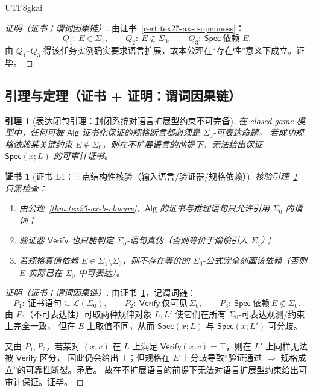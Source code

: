 \documentclass[12pt]{article}
\newtheorem{lemma}{引理}[section]
\newtheorem{Certificate}{证书}[section]
\begin{document}
\begin{CJK*}{UTF8}{gkai}
\begin{proof}[证明（证书；谓词因果链）]
由证书~\ref{cert:tex25-ax-c-openness}：
\[
  Q_1:\ E\in\Sigma_1,\qquad
  Q_2:\ E\notin\Sigma_0,\qquad
  Q_3:\ \mathsf{Spec}\ \text{依赖 }E.
\]
由 $Q_1$--$Q_3$ 得该任务实例确实要求语言扩展，故本公理在“存在性”意义下成立。证毕。
\end{proof}

\subsection{引理与定理（证书 + 证明：谓词因果链）}
\label{subsec:tex25-closed-open-results}

\begin{lemma}[表达闭包引理：封闭系统对语言扩展型约束不可完备]
\label{lem:tex25-lem1-express-closure}
在 closed-game 模型中，任何可被 $\mathsf{Alg}$ 证书化保证的规格断言都必须是 $\Sigma_0$-可表达命题。
若成功规格依赖某关键约束 $E\notin\Sigma_0$，则在不扩展语言的前提下，无法给出保证 $\mathsf{Spec}(x;L)$ 的可审计证书。
\end{lemma}

\begin{Certificate}[证书 L1：三点结构性核验（输入语言/验证器/规格依赖）]
\label{cert:tex25-lem1-express-closure}
核验引理~\ref{lem:tex25-lem1-express-closure} 只需检查：
\begin{enumerate}
  \item 由公理~\ref{thm:tex25-ax-b-closure}，$\mathsf{Alg}$ 的证书与推理语句只允许引用 $\Sigma_0$ 内谓词；
  \item 验证器 $\mathsf{Verify}$ 也只能判定 $\Sigma_0$-语句真伪（否则等价于偷偷引入 $\Sigma_1$）；
  \item 若规格真值依赖 $E\in\Sigma_1\setminus\Sigma_0$，则不存在等价的 $\Sigma_0$-公式完全刻画该依赖（否则 $E$ 实际已在 $\Sigma_0$ 中可表达）。
\end{enumerate}
\end{Certificate}

\begin{proof}[证明（证书；谓词因果链）]
由证书~\ref{cert:tex25-lem1-express-closure}，记谓词链：
\[
  P_1:\ \text{证书语句}\subseteq\mathcal{L}(\Sigma_0),\qquad
  P_2:\ \mathsf{Verify}\ \text{仅可见}\ \Sigma_0,\qquad
  P_3:\ \mathsf{Spec}\ \text{依赖}\ E\notin\Sigma_0.
\]
由 $P_3$（不可表达性）可取两种规律对象 $L,L'$ 使它们在所有 $\Sigma_0$-可表达观测/约束上完全一致，
但在 $E$ 上取值不同，从而 $\mathsf{Spec}(x;L)$ 与 $\mathsf{Spec}(x;L')$ 可分歧。

又由 $P_1,P_2$，若某对 $(x,c)$ 在 $L$ 上满足 $\mathsf{Verify}(x,c)=\top$，则在 $L'$ 上同样无法被 $\mathsf{Verify}$ 区分，
因此仍会给出 $\top$；但规格在 $E$ 上分歧导致“验证通过 $\Rightarrow$ 规格成立”的可靠性断裂。矛盾。
故在不扩展语言的前提下无法对语言扩展型约束给出可审计保证。证毕。
\end{proof}


\end{CJK*}
\end{document}
